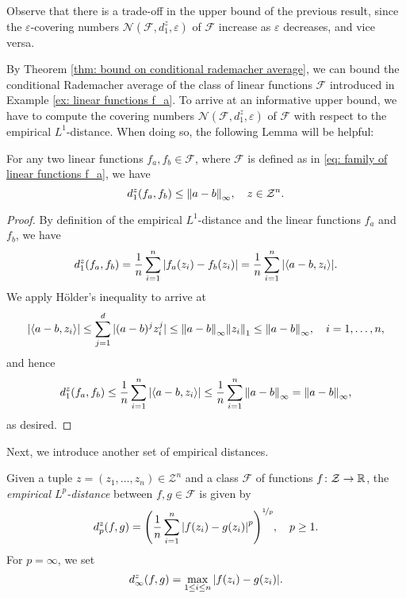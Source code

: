 Observe that there is a trade-off in the upper bound of the previous result, since the $\varepsilon$-covering numbers $\mathcal{N}(\mathcal{F}, d_1^z, \varepsilon)$ of $\mathcal{F}$ increase as $\varepsilon$ decreases, and vice versa. 

By Theorem \ref{thm: bound on conditional rademacher average}, we can bound the conditional Rademacher average of the class of linear functions $\mathcal{F}$ introduced in Example \ref{ex: linear functions f_a}. To arrive at an informative upper bound, we have to compute the covering numbers $\mathcal{N}(\mathcal{F}, d_1^z, \varepsilon)$ of $\mathcal{F}$ with respect to the empirical $L^1$-distance. When doing so, the following Lemma will be helpful:

\begin{lemma}
For any two linear functions $f_a, f_b \in \mathcal{F}$, where $\mathcal{F}$ is defined as in \eqref{eq: family of linear functions f_a}, we have
\[
    d_1^z(f_a, f_b) \leq \norm{a - b}_{\infty}, \quad z \in \mathcal{Z}^n.
\]
\end{lemma}

\begin{proof}
By definition of the empirical $L^1$-distance and the linear functions $f_a$ and $f_b$, we have
\[
    d_1^z(f_a, f_b) = \frac{1}{n} \sum_{i=1}^n \abs{f_a(z_i) - f_b(z_i)} = \frac{1}{n} \sum_{i=1}^n \abs{\langle a - b, z_i \rangle}.
\]
We apply H{\"o}lder's inequality to arrive at
\[
    \abs{\langle a - b, z_i \rangle} \leq \sum_{j=1}^d \abs*{(a - b)^j z_i^j} \leq \norm{a - b}_{\infty} \norm{z_i}_1 \leq \norm{a - b}_{\infty}, \quad i = 1, \dots, n,
\]
and hence
\[
    d_1^z(f_a, f_b) \leq \frac{1}{n} \sum_{i=1}^n \abs{\langle a - b, z_i \rangle} \leq \frac{1}{n} \sum_{i=1}^n \norm{a - b}_{\infty} = \norm{a - b}_{\infty},
\]
as desired.
\end{proof}

Next, we introduce another set of empirical distances.

\begin{definition}
Given a tuple $z = (z_1, \dots, z_n) \in \mathcal{Z}^n$ and a class $\mathcal{F}$ of functions $f \colon \mathcal{Z} \to \mathbb{R}$, the \emph{empirical $L^p$-distance} between $f, g \in \mathcal{F}$ is given by
\[
    d_p^z(f, g) = \left(\frac{1}{n} \sum_{i=1}^n \abs{f(z_i) - g(z_i)}^p \right)^{\nicefrac{1}{p}}, \quad p \geq 1.
\]
For $p = \infty$, we set
\[
    d_{\infty}^z(f, g) = \max_{1 \leq i \leq n} \abs{f(z_i) - g(z_i)}.
\]
\end{definition}

